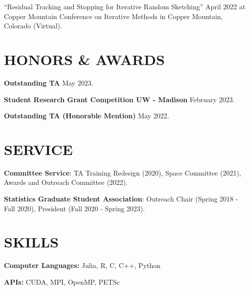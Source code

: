 \documentclass[margin,11pt]{res}
\begin{document}
\begin{resume}
``Residual Tracking and Stopping for Iterative Random Sketching'' April 2022 at Copper Mountain Conference on Iterative Methods in Copper Mountain, Colorado (Virtual).




\section{HONORS \& AWARDS} 
{\bf Outstanding TA} \hfill May 2023.

{\bf Student Research Grant Competition UW - Madison} \hfill February 2023.

{\bf Outstanding TA (Honorable Mention)} \hfill May 2022.

\section{SERVICE}

\textbf{Committee Service}: TA Training Redesign (2020), Space Committee (2021), Awards and Outreach Committee (2022).

\textbf{Statistics Graduate Student Association}: Outreach Chair (Spring 2018 - Fall 2020), President (Fall 2020 - Spring 2023). 

\section{SKILLS}
\textbf{Computer Languages:} Julia, R, C, C++, Python

\textbf{APIs:} CUDA, MPI, OpenMP, PETSc

\end{resume} 
\end{document}
